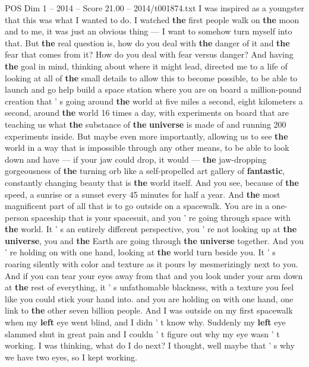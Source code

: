 \begin{textsample}{POS Dim 1 – 2014 – Score 21.00 – 2014/t001874.txt}
I was inspired as a youngster that this was what I wanted to do.
I watched \textbf{the} first people walk on \textbf{the} moon and to me, it was just an obvious thing — I want to somehow turn myself into that.
But \textbf{the} real question is, how do you deal with \textbf{the} danger of it and \textbf{the} fear that comes from it?
How do you deal with fear versus danger?
And having \textbf{the} goal in mind, thinking about where it might lead, directed me to a life of looking at all of \textbf{the} small details to allow this to become possible, to be able to launch and go help build a space station where you are on board a million-pound creation that ' s going around \textbf{the} world at five miles a second, eight kilometers a second, around \textbf{the} world 16 times a day, with experiments on board that are teaching us what \textbf{the} substance of \textbf{the} \textbf{universe} is made of and running 200 experiments inside.
But maybe even more importantly, allowing us to see \textbf{the} world in a way that is impossible through any other means, to be able to look down and have — if your jaw could drop, it would — \textbf{the} jaw-dropping gorgeousness of \textbf{the} turning orb like a self-propelled art gallery of \textbf{fantastic}, constantly changing beauty that is \textbf{the} world itself.
And you see, because of \textbf{the} speed, a sunrise or a sunset every 45 minutes for half a year.
And \textbf{the} most magnificent part of all that is to go outside on a spacewalk.
You are in a one- person spaceship that is your spacesuit, and you ' re going through space with \textbf{the} world.
It ' s an entirely different perspective, you ' re not looking up at \textbf{the} \textbf{universe}, you and \textbf{the} Earth are going through \textbf{the} \textbf{universe} together.
And you ' re holding on with one hand, looking at \textbf{the} world turn beside you.
It ' s roaring silently with color and texture as it pours by mesmerizingly next to you.
And if you can tear your eyes away from that and you look under your arm down at \textbf{the} rest of everything, it ' s unfathomable blackness, with a texture you feel like you could stick your hand into. and you are holding on with one hand, one link to \textbf{the} other seven billion people.
And I was outside on my first spacewalk when my \textbf{left} eye went blind, and I didn ' t know why.
Suddenly my \textbf{left} eye slammed shut in great pain and I couldn ' t figure out why my eye wasn ' t working.
I was thinking, what do I do next?
I thought, well maybe that ' s why we have two eyes, so I kept working.

\end{textsample}
